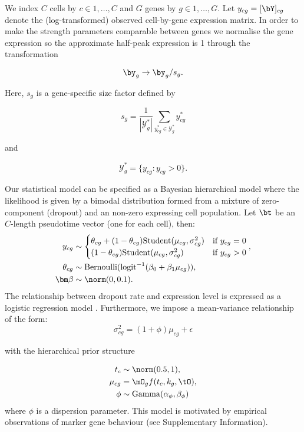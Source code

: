 We index $C$ cells by $c \in 1, \ldots, C$ and $G$ genes by $g \in 1, \ldots, G$. Let $y_{cg} = [\bY]_{cg}$ denote the (log-transformed) observed cell-by-gene expression matrix. In order to make the strength parameters comparable between genes we normalise the gene expression so the approximate half-peak expression is 1 through the transformation

\begin{equation}
\by_g \rightarrow \by_g / s_g.
\end{equation}

Here, $s_g$ is a gene-specific size factor defined by

\begin{equation}
s_g = \frac{1}{|\mathcal{Y}_g^*|} \sum_{y_{cg}^* \in \mathcal{Y}_g^*} y_{cg}^*
\end{equation}

and

\begin{equation}
\mathcal{Y}_g^* = \{ y_{cg} : y_{cg} > 0 \}.
\end{equation}


Our statistical model can be specified as a Bayesian hierarchical model where the likelihood is given by a bimodal distribution formed from a mixture of zero-component (dropout) and an non-zero expressing cell population. Let $\bt$ be an $C$-length pseudotime vector (one for each cell), then:
\begin{align}
		y_{cg} & \sim \begin{cases}
		\theta_{cg} + (1 - \theta_{cg}) \mathrm{Student}(\mu_{cg}, \sigma^2_{cg}) & \mbox{if } y_{cg} = 0 \\
		 (1 - \theta_{cg}) \mathrm{Student}(\mu_{cg}, \sigma^2_{cg}) & \mbox{if } y_{cg} > 0
		\end{cases}, \\
		\theta_{cg} & \sim \mathrm{Bernoulli}(\mathrm{logit}^{-1} (\beta_0 + \beta_1 \mu_{cg})), \\
		\bm \beta & \sim \norm(0, 0.1) .
\end{align}
The relationship between dropout rate and expression level is expressed as a logistic regression model \cite{Kharchenko2014}. Furthermore, we impose a mean-variance relationship of the form:
\begin{equation}
\sigma^2_{cg}  = (1 + \phi) \mu_{cg} + \epsilon
\end{equation}

with the hierarchical prior structure

\begin{align}
	t_c &\sim \norm(0.5, 1), \\
	\mu_{cg} & =  \mO_g f(t_c, k_g, \tO), \\
	\phi & \sim \mathrm{Gamma}(\alpha_\phi, \beta_\phi)
\end{align}
where $\phi$ is a dispersion parameter. This model is motivated by empirical observations of marker gene behaviour (see Supplementary Information).

